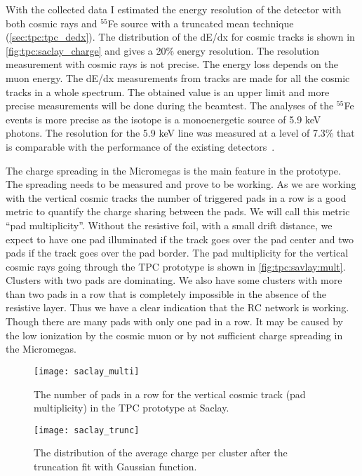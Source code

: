 \documentclass[../main.tex]{subfiles}
\begin{document}
With the collected data I estimated the energy resolution of the detector with both cosmic rays and ${}^{55}$Fe source with a truncated mean technique (\autoref{sec:tpc:tpc_dedx}). The distribution of the dE/dx for cosmic tracks is shown in \autoref{fig:tpc:saclay_charge} and gives a 20\% energy resolution. The resolution measurement with cosmic rays is not precise. The energy loss depends on the muon energy. The dE/dx measurements from tracks are made for all the cosmic tracks in a whole spectrum. The obtained value is an upper limit and more precise measurements will be done during the beamtest. The analyses of the ${}^{55}$Fe events is more precise as the isotope is a monoenergetic source of 5.9 keV photons. The resolution for the 5.9 keV line was measured at a level of 7.3\% that is comparable with the performance of the existing detectors~\cite{Abgrall2011}.

The charge spreading in the Micromegas is the main feature in the prototype. The spreading needs to be measured and prove to be working. As we are working with the vertical cosmic tracks the number of triggered pads in a row is a good metric to quantify the charge sharing between the pads. We will call this metric ``pad multiplicity''. Without the resistive foil, with a small drift distance, we expect to have one pad illuminated if the track goes over the pad center and two pads if the track goes over the pad border. The pad multiplicity for the vertical cosmic rays going through the TPC prototype is shown in \autoref{fig:tpc:savlay:mult}. Clusters with two pads are dominating. We also have some clusters with more than two pads in a row that is completely impossible in the absence of the resistive layer. Thus we have a clear indication that the RC network is working. Though there are many pads with only one pad in a row. It may be caused by the low ionization by the cosmic muon or by not sufficient charge spreading in the Micromegas.

\begin{figure}[!ht]
  \centering
  \begin{minipage}{0.45\linewidth}
    \centering
    \texttt{[image: saclay\_multi]}
    \caption{The number of pads in a row for the vertical cosmic track (pad multiplicity) in the TPC prototype at Saclay.}
    \label{fig:tpc:savlay:mult}
  \end{minipage}
  \begin{minipage}{0.09\linewidth}
    \hspace{\linewidth}
  \end{minipage}
  \begin{minipage}{0.45\linewidth}
    \centering
    \texttt{[image: saclay\_trunc]}
    \caption{The distribution of the average charge per cluster after the truncation fit with Gaussian function.}
    \label{fig:tpc:saclay_charge}
  \end{minipage}
\end{figure}
\end{document}
